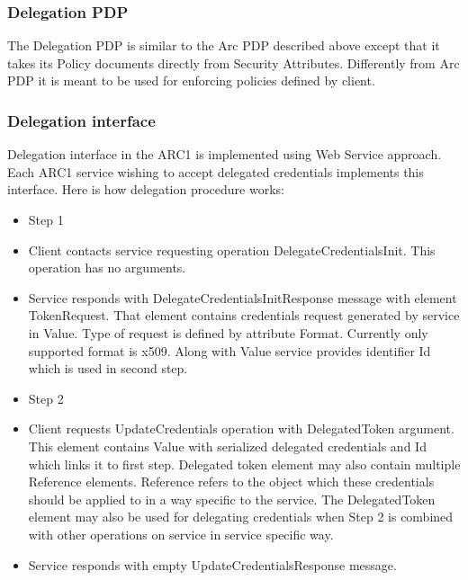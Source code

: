 \documentclass[a4paper]{article}
\newcommand\liststyleWWviiiNumix{%
\renewcommand\labelitemi{[F0B7?]}
\renewcommand\labelitemii{{}-}
\renewcommand\labelitemiii{${\blacksquare}$}
\renewcommand\labelitemiv{[F06C?]}
}
\newcommand\liststyleWWviiiNumx{%
\renewcommand\labelitemi{[F0B7?]}
\renewcommand\labelitemii{[F081?]}
\renewcommand\labelitemiii{${\blacksquare}$}
\renewcommand\labelitemiv{[F06C?]}
}
\begin{document}
\subsubsection[Delegation PDP]{Delegation PDP}
\label{bkm:Ref204009695}{\upshape\color{black}
The Delegation PDP is similar to the Arc PDP described above except that
it takes it{\textquotesingle}s Policy documents directly from Security
Attributes. Differently from Arc PDP it is meant to be used for
enforcing policies defined by client.}

\subsubsection[Delegation interface]{Delegation interface}
\label{bkm:Ref204009766}{\upshape\color{black}
Delegation interface in the ARC1 is implemented using Web Service
approach. Each ARC1 service wishing to accept delegated credentials
implements this interface. Here is how delegation procedure works:}

\liststyleWWviiiNumix
\begin{itemize}
\item {\color{black}
Step 1}
\item {\color{black}
Client contacts service requesting operation DelegateCredentialsInit.
This operation has no arguments.}
\item {\color{black}
Service responds with DelegateCredentialsInitResponse message with
element TokenRequest. That element contains credentials request
generated by service in Value. Type of request is defined by attribute
Format. Currently only supported format is x509. Along with Value
service provides identifier Id which is used in second step.}
\end{itemize}
\liststyleWWviiiNumx
\begin{itemize}
\item {\color{black}
Step 2}
\item {\color{black}
Client requests UpdateCredentials operation with DelegatedToken
argument. This element contains Value with serialized delegated
credentials and Id which links it to first step. Delegated token
element may also contain multiple Reference elements. Reference refers
to the object which these credentials should be applied to in a way
specific to the service. The DelegatedToken element may also be used
for delegating credentials when Step 2 is combined with other
operations on service in service specific way.}
\item {\color{black}
Service responds with empty UpdateCredentialsResponse message.}
\end{itemize}
\end{document}
